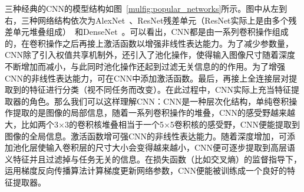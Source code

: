 三种经典的CNN的模型结构如图~\ref{mulfig:popular_networks}所示。图中从左到右，三种网络结构依次为AlexNet~\cite{krizhevsky2012imagenet}、ResNet残差单元（ResNet实际上是由多个残差单元堆叠组成）~\cite{he2016deep, he2016identity}和DenseNet~\cite{huang2017densely}。可以看出，CNN都是由一系列卷积操作组成的，在卷积操作之后再接上激活函数以增强非线性表达能力。为了减少参数量，CNN除了引入权值共享机制外，还引入了池化操作，使得输入图像尺寸随着深度不断增加而减小，与此同时池化操作还起到过滤无关信息的的作用。为了增强CNN的非线性表达能力，可在CNN中添加激活函数。最后，再接上全连接层对提取到的特征进行分类（视不同任务而改变）。在此过程中，CNN实际上充当特征提取器的角色。那么我们可以这样理解CNN：CNN是一种层次化结构，单纯卷积操作提取的是图像的局部信息，随着一系列卷积操作的堆叠，CNN的感受野越来越大，比如两个3$\times$3的卷积核堆叠相当于一个5$\times$5卷积核的感受野，CNN便能提取到图像的全局信息。激活函数增可强CNN的非线性表达能力。随着深度增加，可添加池化层使输入卷积层的尺寸大小会变得越来越小，CNN便可逐步提取到高层语义特征并且过滤掉与任务无关的信息。在损失函数（比如交叉熵）的监督指导下，运用梯度反向传播算法计算梯度更新网络参数，CNN便能被训练成一个良好的特征提取器。


